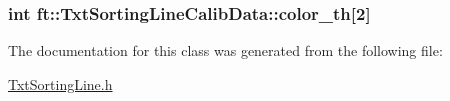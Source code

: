 \subsubsection[{\texorpdfstring{color\+\_\+th}{color_th}}]{\setlength{\rightskip}{0pt plus 5cm}int ft\+::\+Txt\+Sorting\+Line\+Calib\+Data\+::color\+\_\+th\mbox{[}2\mbox{]}}\hypertarget{classft_1_1_txt_sorting_line_calib_data_ae6112a6ef434530221946275b47479f7}{}\label{classft_1_1_txt_sorting_line_calib_data_ae6112a6ef434530221946275b47479f7}


The documentation for this class was generated from the following file\+:\begin{DoxyCompactItemize}
\item 
\hyperlink{_txt_sorting_line_8h}{Txt\+Sorting\+Line.\+h}\end{DoxyCompactItemize}

